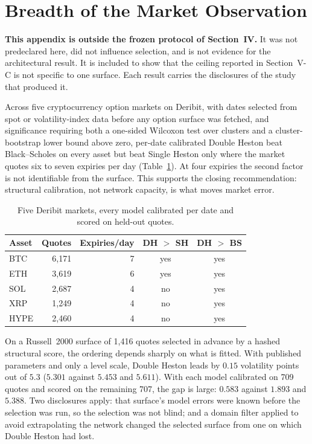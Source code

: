\documentclass[conference]{IEEEtran}
\begin{document}
\FloatBarrier

\section{Breadth of the Market Observation}
\label{app:market}

\textbf{This appendix is outside the frozen protocol of Section~IV.} It was not
predeclared here, did not influence selection, and is not evidence for the
architectural result. It is included to show that the ceiling reported in
Section~V-C is not specific to one surface. Each result carries the disclosures
of the study that produced it.

Across five cryptocurrency option markets on Deribit, with dates selected from
spot or volatility-index data before any option surface was fetched, and
significance requiring both a one-sided Wilcoxon test over clusters and a
cluster-bootstrap lower bound above zero, per-date calibrated Double Heston
beat Black--Scholes on every asset but beat Single Heston only where the market
quotes six to seven expiries per day (Table~\ref{tab:crypto}). At four expiries
the second factor is not identifiable from the surface. This supports the
closing recommendation: structural calibration, not network capacity, is what
moves market error.

\begin{table}[!t]
\centering
\caption{Five Deribit markets, every model calibrated per date and scored on
held-out quotes.}
\label{tab:crypto}
\begin{tabular}{lrrcc}
\toprule
Asset & Quotes & Expiries/day & DH $>$ SH & DH $>$ BS \\
\midrule
BTC & 6{,}171 & 7 & yes & yes \\
ETH & 3{,}619 & 6 & yes & yes \\
SOL & 2{,}687 & 4 & no & yes \\
XRP & 1{,}249 & 4 & no & yes \\
HYPE & 2{,}460 & 4 & no & yes \\
\bottomrule
\end{tabular}
\end{table}

On a Russell~2000 surface of 1,416 quotes selected in advance by a hashed
structural score, the ordering depends sharply on what is fitted. With
published parameters and only a level scale, Double Heston leads by $0.15$
volatility points out of $5.3$ ($5.301$ against $5.453$ and $5.611$). With each
model calibrated on 709 quotes and scored on the remaining 707, the gap is
large: $0.583$ against $1.893$ and $5.388$. Two disclosures apply: that
surface's model errors were known before the selection was run, so the
selection was not blind; and a domain filter applied to avoid extrapolating the
network changed the selected surface from one on which Double Heston had lost.
\end{document}
